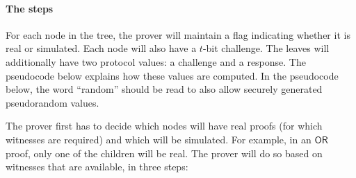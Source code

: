 \documentclass[11pt]{article}
\newcommand{\ornode}{\ensuremath{\mathsf{OR}}}
\begin{document}
\paragraph{The steps}
For each node in the tree, the prover will maintain a flag indicating whether it is real or simulated. Each node will also have a $t$-bit challenge. The leaves will additionally have two protocol values: a challenge and a response. The pseudocode below explains how these values are computed. In the pseudocode below, the word ``random'' should be read to also allow securely generated pseudorandom values.


The prover first has to decide which nodes will have real proofs (for which witnesses are required) and which will be simulated. For example, in an $\ornode$ proof, only one of the children will be real. The prover will do so based on witnesses that are available, in three steps:
\end{document}
